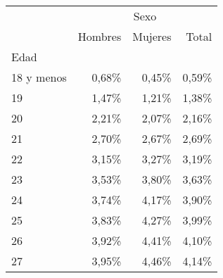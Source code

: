\begin{tabular}{llll}
\cline{1-4}
\multicolumn{1}{c}{} &
  \multicolumn{3}{|c}{Sexo} \\
\multicolumn{1}{c}{} &
  \multicolumn{1}{|r}{Hombres} &
  \multicolumn{1}{r}{Mujeres} &
  \multicolumn{1}{r}{Total} \\
\cline{1-4}
\multicolumn{1}{l}{Edad} &
  \multicolumn{1}{|r}{} &
  \multicolumn{1}{r}{} &
  \multicolumn{1}{r}{} \\
\multicolumn{1}{l}{\hspace{1em}18 y menos} &
  \multicolumn{1}{|r}{0,68\%} &
  \multicolumn{1}{r}{0,45\%} &
  \multicolumn{1}{r}{0,59\%} \\
\multicolumn{1}{l}{\hspace{1em}19} &
  \multicolumn{1}{|r}{1,47\%} &
  \multicolumn{1}{r}{1,21\%} &
  \multicolumn{1}{r}{1,38\%} \\
\multicolumn{1}{l}{\hspace{1em}20} &
  \multicolumn{1}{|r}{2,21\%} &
  \multicolumn{1}{r}{2,07\%} &
  \multicolumn{1}{r}{2,16\%} \\
\multicolumn{1}{l}{\hspace{1em}21} &
  \multicolumn{1}{|r}{2,70\%} &
  \multicolumn{1}{r}{2,67\%} &
  \multicolumn{1}{r}{2,69\%} \\
\multicolumn{1}{l}{\hspace{1em}22} &
  \multicolumn{1}{|r}{3,15\%} &
  \multicolumn{1}{r}{3,27\%} &
  \multicolumn{1}{r}{3,19\%} \\
\multicolumn{1}{l}{\hspace{1em}23} &
  \multicolumn{1}{|r}{3,53\%} &
  \multicolumn{1}{r}{3,80\%} &
  \multicolumn{1}{r}{3,63\%} \\
\multicolumn{1}{l}{\hspace{1em}24} &
  \multicolumn{1}{|r}{3,74\%} &
  \multicolumn{1}{r}{4,17\%} &
  \multicolumn{1}{r}{3,90\%} \\
\multicolumn{1}{l}{\hspace{1em}25} &
  \multicolumn{1}{|r}{3,83\%} &
  \multicolumn{1}{r}{4,27\%} &
  \multicolumn{1}{r}{3,99\%} \\
\multicolumn{1}{l}{\hspace{1em}26} &
  \multicolumn{1}{|r}{3,92\%} &
  \multicolumn{1}{r}{4,41\%} &
  \multicolumn{1}{r}{4,10\%} \\
\multicolumn{1}{l}{\hspace{1em}27} &
  \multicolumn{1}{|r}{3,95\%} &
  \multicolumn{1}{r}{4,46\%} &
  \multicolumn{1}{r}{4,14\%} \\

\end{tabular}
